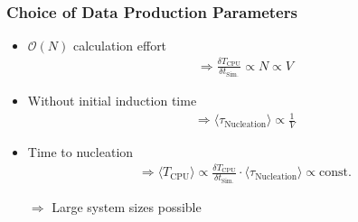 \documentclass[smaller,notes=hide]{beamer}
\newlength{\wideitemsep}
\let\olditem\item
\renewcommand{\item}{\setlength{\itemsep}{\wideitemsep}\olditem}
\begin{document}
\fi


\begin{frame}
\frametitle{Choice of Data Production Parameters}
\begin{itemize}
\item $\mathcal{O}(N)$ calculation effort
\begin{align*}
\label{eqn:system_size}
\Rightarrow  \frac{\delta T_{\text{CPU}}}{\delta t_{\text{Sim.}}} \propto N \propto V 
\end{align*}

\item Without initial induction time
\begin{align*}
\Rightarrow \langle \tau_{\text{Nucleation}} \rangle \propto \frac{1}{V}
\end{align*}

\item Time to nucleation
\begin{align*}
\Rightarrow  \langle T_{\text{CPU}} \rangle \propto  \frac{\delta T_{\text{CPU}}}{\delta t_{\text{Sim.}}}  \cdot \langle \tau_{\text{Nucleation}} \rangle \propto \text{const.}
\end{align*}
\vspace{0.1cm}

\quad $\Rightarrow$  Large system sizes possible
\end{itemize}
\end{frame}
\end{document}
